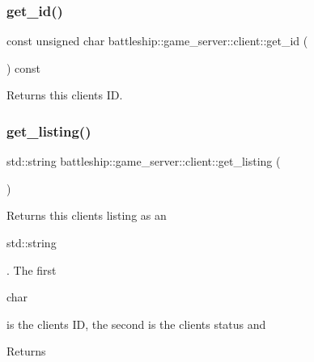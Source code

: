 \subsubsection{\texorpdfstring{get\+\_\+id()}{get\_id()}\hspace{0.1cm}{\footnotesize\ttfamily [2/2]}}
{\footnotesize\ttfamily const unsigned char battleship\+::game\+\_\+server\+::client\+::get\+\_\+id (\begin{DoxyParamCaption}{ }\end{DoxyParamCaption}) const\hspace{0.3cm}{\ttfamily [inline]}}

\begin{DoxyReturn}{Returns}
this client\textquotesingle{}s ID. 
\end{DoxyReturn}
\mbox{\label{classbattleship_1_1game__server_1_1client_a828c6732dc5e35bd2cfd1f73d69a54a9}} 
\subsubsection{\texorpdfstring{get\+\_\+listing()}{get\_listing()}}
{\footnotesize\ttfamily std\+::string battleship\+::game\+\_\+server\+::client\+::get\+\_\+listing (\begin{DoxyParamCaption}{ }\end{DoxyParamCaption})\hspace{0.3cm}{\ttfamily [inline]}}

Returns this client\textquotesingle{}s listing as an
\begin{DoxyCode}
std::string 
\end{DoxyCode}
 . The first 
\begin{DoxyCode}
\textcolor{keywordtype}{char} 
\end{DoxyCode}
 is the client\textquotesingle{}s ID, the second is the client\textquotesingle{}s status and

\begin{DoxyReturn}{Returns}

\end{DoxyReturn}
\mbox{\label{classbattleship_1_1game__server_1_1client_abb6392156781049b20f0e7490da49840}} 
